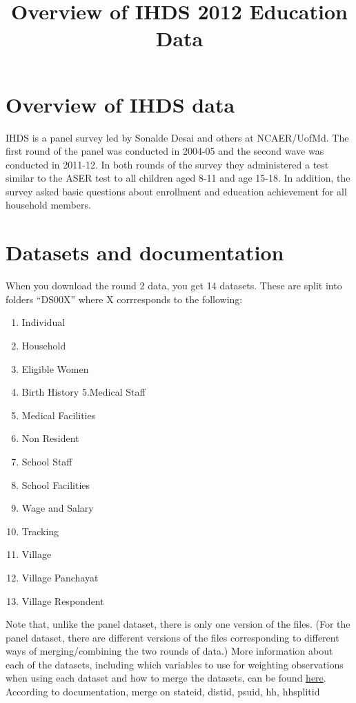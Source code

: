 \documentclass[
]{article}
\title{Overview of IHDS 2012 Education Data}
\author{}
\date{\vspace{-2.5em}}
\providecommand{\tightlist}{%
  \setlength{\itemsep}{0pt}\setlength{\parskip}{0pt}}
\begin{document}
\maketitle

\hypertarget{overview-of-ihds-data}{%
\section{Overview of IHDS data}\label{overview-of-ihds-data}}

IHDS is a panel survey led by Sonalde Desai and others at NCAER/UofMd.
The first round of the panel was conducted in 2004-05 and the second
wave was conducted in 2011-12. In both rounds of the survey they
administered a test similar to the ASER test to all children aged 8-11
and age 15-18. In addition, the survey asked basic questions about
enrollment and education achievement for all household members.

\hypertarget{datasets-and-documentation}{%
\section{Datasets and documentation}\label{datasets-and-documentation}}

When you download the round 2 data, you get 14 datasets. These are split
into folders ``DS00X'' where X corrresponds to the following:

\begin{enumerate}
\def\labelenumi{\arabic{enumi}.}
\tightlist
\item
  Individual
\item
  Household
\item
  Eligible Women
\item
  Birth History 5.Medical Staff
\item
  Medical Facilities
\item
  Non Resident
\item
  School Staff
\item
  School Facilities
\item
  Wage and Salary
\item
  Tracking
\item
  Village
\item
  Village Panchayat
\item
  Village Respondent
\end{enumerate}

Note that, unlike the panel dataset, there is only one version of the
files. (For the panel dataset, there are different versions of the files
corresponding to different ways of merging/combining the two rounds of
data.) More information about each of the datasets, including which
variables to use for weighting observations when using each dataset and
how to merge the datasets, can be found
\href{https://www.icpsr.umich.edu/icpsrweb/content/DSDR/idhs-II-data-guide.html}{here}.
According to documentation, merge on stateid, distid, psuid, hh,
hhsplitid
\end{document}

